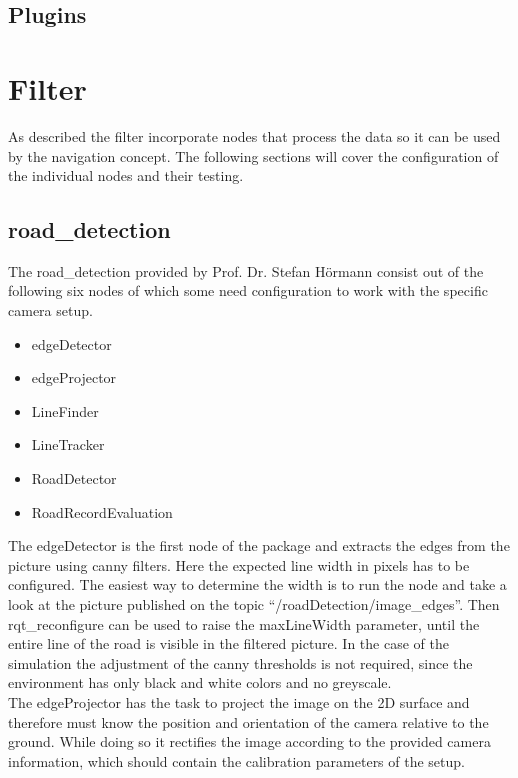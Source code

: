 \subsection{Plugins}



\section{Filter}

As described the filter incorporate nodes that process the data so it can be used by the navigation concept. The following sections will cover the configuration of the individual nodes and their testing.

\subsection{road\_detection}
The road\_detection provided by Prof. Dr. Stefan Hörmann consist out of the following six nodes of which some need configuration to work with the specific camera setup.

\begin{itemize}
	\item edgeDetector
	\item edgeProjector
	\item LineFinder
	\item LineTracker
	\item RoadDetector
	\item RoadRecordEvaluation
\end{itemize}

The edgeDetector is the first node of the package and extracts the edges from the picture using canny filters. Here the expected line width in pixels has to be configured. The easiest way to determine the width is to run the node and take a look at the picture published on the topic ``/roadDetection/image\_edges''. Then rqt\_reconfigure can be used to raise the maxLineWidth parameter, until the entire line of the road is visible in the filtered picture. In the case of the simulation the adjustment of the canny thresholds is not required, since the environment has only black and white colors and no greyscale.\\

The edgeProjector has the task to project the image on the 2D surface and therefore must know the position and orientation of the camera relative to the ground. While doing so it rectifies the image according to the provided camera information, which should contain the calibration parameters of the setup.

